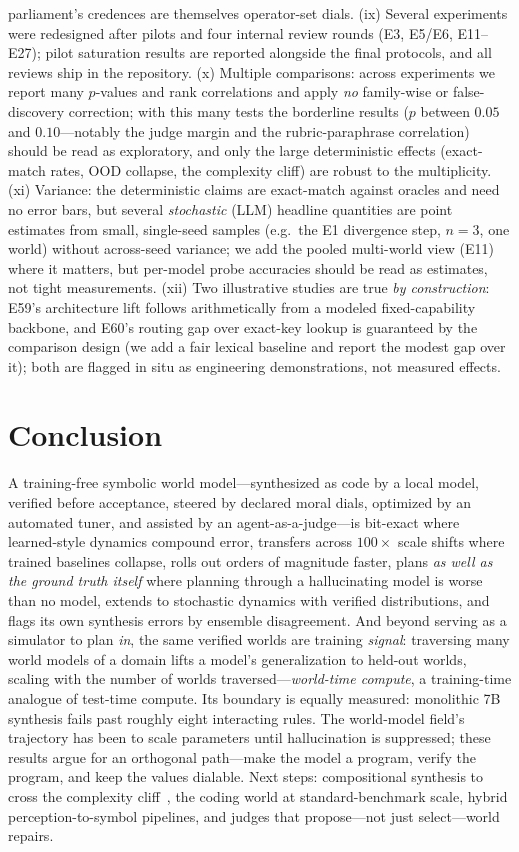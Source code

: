 \documentclass[11pt]{article}
\begin{document}
parliament's credences are themselves operator-set dials. (ix) Several
experiments were redesigned after pilots and four internal review rounds
(E3, E5/E6, E11--E27); pilot saturation results are reported alongside the
final protocols, and all reviews ship in the repository.
(x) Multiple comparisons: across \NumExperiments{} experiments we report many
$p$-values and rank correlations and apply \emph{no} family-wise or
false-discovery correction; with this many tests the borderline results
($p$ between $0.05$ and $0.10$---notably the judge margin and the
rubric-paraphrase correlation) should be read as exploratory, and only the
large deterministic effects (exact-match rates, OOD collapse, the complexity
cliff) are robust to the multiplicity. (xi) Variance: the deterministic claims
are exact-match against oracles and need no error bars, but several
\emph{stochastic} (LLM) headline quantities are point estimates from small,
single-seed samples (e.g.\ the E1 divergence step, $n{=}3$, one world) without
across-seed variance; we add the pooled multi-world view (E11) where it
matters, but per-model probe accuracies should be read as estimates, not tight
measurements. (xii) Two illustrative studies are true \emph{by construction}:
E59's architecture lift follows arithmetically from a modeled fixed-capability
backbone, and E60's routing gap over exact-key lookup is guaranteed by the
comparison design (we add a fair lexical baseline and report the modest gap over
it); both are flagged in situ as engineering demonstrations, not measured effects.

\section{Conclusion}
A training-free symbolic world model---synthesized as code by a local model,
verified before acceptance, steered by declared moral dials, optimized by an
automated tuner, and assisted by an agent-as-a-judge---is bit-exact where
learned-style dynamics compound error, transfers across $100\times$ scale
shifts where trained baselines collapse, rolls out orders of magnitude
faster, plans \emph{as well as the ground truth itself} where planning
through a hallucinating model is worse than no model, extends to stochastic
dynamics with verified distributions, and flags its own synthesis errors by
ensemble disagreement. And beyond serving as a simulator to plan \emph{in}, the same
verified worlds are training \emph{signal}: traversing many world models of a domain
lifts a model's generalization to held-out worlds, scaling with the number of worlds
traversed---\emph{world-time compute}, a training-time analogue of test-time compute.
Its boundary is equally measured: monolithic 7B
synthesis fails past roughly eight interacting rules. The world-model field's
trajectory has been to scale parameters until hallucination is suppressed;
these results argue for an orthogonal path---make the model a program, verify
the program, and keep the values dialable. Next steps: compositional
synthesis to cross the complexity cliff~\cite{poeworld2025}, the coding world
at standard-benchmark scale, hybrid perception-to-symbol pipelines, and
judges that propose---not just select---world repairs.
\end{document}
